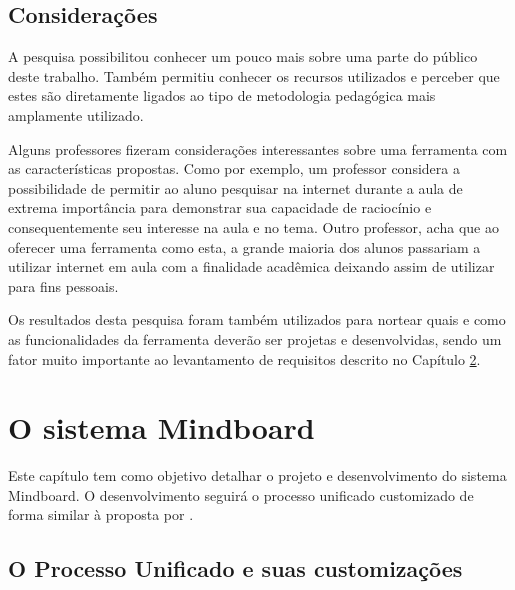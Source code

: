 


\section{Considerações}

A pesquisa possibilitou conhecer um pouco mais sobre uma parte do público deste trabalho. Também permitiu conhecer os recursos utilizados e perceber que estes são diretamente ligados ao tipo de metodologia pedagógica mais amplamente utilizado.

Alguns professores fizeram considerações interessantes sobre uma ferramenta com as características propostas. Como por exemplo, um professor considera a possibilidade de permitir ao aluno pesquisar na internet durante a aula de extrema importância para demonstrar sua capacidade de raciocínio e consequentemente seu interesse na aula e no tema. Outro professor, acha que ao oferecer uma ferramenta como esta, a grande maioria dos alunos passariam a utilizar internet em aula com a finalidade acadêmica deixando assim de utilizar para fins pessoais.

Os resultados desta pesquisa foram também utilizados para nortear quais e como as funcionalidades da ferramenta deverão ser projetas e desenvolvidas, sendo um fator muito importante ao levantamento de requisitos descrito no Capítulo \ref{cap:mindboard}.


\chapter{O sistema Mindboard}
\label{cap:mindboard}

Este capítulo tem como objetivo detalhar o projeto e desenvolvimento do sistema Mindboard. O desenvolvimento seguirá o processo unificado customizado de forma similar à proposta por .

\section{O Processo Unificado e suas customizações}

